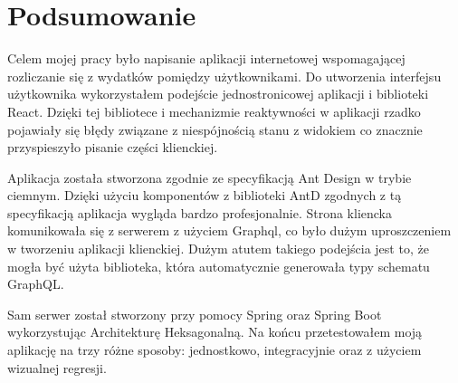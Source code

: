 \documentclass[
    left=2.5cm,         %
    right=2.5cm,        %
    top=2.5cm,          %
    bottom=3cm,         %
    bindingoffset=6mm,  %
    nohyphenation=false %
]{eiti/eiti-thesis}
\begin{document}


\clearpage %
\section{Podsumowanie}          %
Celem mojej pracy było napisanie aplikacji internetowej wspomagającej rozliczanie się z wydatków pomiędzy użytkownikami. Do utworzenia interfejsu użytkownika wykorzystałem podejście jednostronicowej aplikacji i biblioteki React. Dzięki tej bibliotece i mechanizmie reaktywności w aplikacji rzadko pojawiały się błędy związane z niespójnością stanu z widokiem co znacznie przyspieszyło pisanie części klienckiej.

Aplikacja została stworzona zgodnie ze specyfikacją Ant Design w trybie ciemnym. Dzięki użyciu komponentów z biblioteki AntD zgodnych z tą specyfikacją aplikacja wygląda bardzo profesjonalnie. Strona kliencka komunikowała się z serwerem z użyciem Graphql, co było dużym uproszczeniem w tworzeniu aplikacji klienckiej. Dużym atutem takiego podejścia jest to, że mogła być użyta biblioteka, która automatycznie generowała typy schematu GraphQL.

 Sam serwer został stworzony przy pomocy Spring oraz Spring Boot wykorzystując Architekturę Heksagonalną. Na końcu przetestowałem moją aplikację na trzy różne sposoby: jednostkowo, integracyjnie oraz z użyciem wizualnej regresji.

\cleardoublepage %
\printbibliography


\newpage
\pagestyle{plain}

\vspace{0.8cm}

\listoffigurestoc     %
\vspace{1cm}          %
\lstlistoflistings    %
\vspace{1cm}          %

\end{document}
